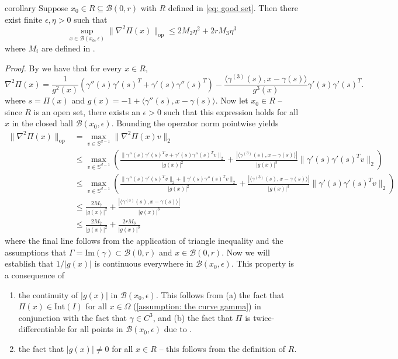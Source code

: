 \documentclass[11pt]{article}
\begin{document}
\begin{restatable}{corollary}{} \label{lemma: operator norm bound}
    Suppose $x_0 \in R \subseteq \mathcal{B}(0, r)$ with $R$ defined in \cref{eq: good set}. Then there exist finite $\epsilon, \eta > 0$ such that 
    \[ \sup_{x\in \mathcal{B}(x_0,\epsilon)}\|\nabla^2\Pi(x)\|_{\text{op}} \leq 2M_2\eta^{2}+2rM_3\eta^{3}\]
    where $M_i$ are defined in .
\end{restatable}

\noindent \textit{Proof.} By  we have that for every $x \in R$, 
\[\nabla^2\Pi(x) = \frac{1}{g^2(x)}\left(\gamma''(s)\gamma'(s)^T + \gamma'(s)\gamma''(s)^T\right)- \frac{\langle\gamma^{(3)}(s), x - \gamma(s)\rangle}{g^3(x)}\gamma'(s)\gamma'(s)^T.\]
where $s = \Pi(x)$ and $g(x) = -1 + \langle\gamma''(s), x-\gamma(s)\rangle$. Now let $x_0 \in R$ -- since $R$ is an open set, there exists an $\epsilon > 0$ such that this expression holds for all $x$ in the closed ball $\mathcal{B}(x_0, \epsilon)$. Bounding the operator norm pointwise yields
\begin{align*}
    \|\nabla^2\Pi(x)\|_{\text{op}} &= \max_{v\in \mathbb{S}^{d-1}} \|\nabla^2\Pi(x)v\|_2 \\
    &\leq \max_{v\in \mathbb{S}^{d-1}}\left(\frac{\|\gamma''(s)\gamma'(s)^Tv + \gamma'(s)\gamma''(s)^Tv\|_2}{|g(x)|^2} + \frac{|\langle\gamma^{(3)}(s), x - \gamma(s)\rangle|}{|g(x)|^3} \|\gamma'(s)\gamma'(s)^Tv\|_2\right) \\
    &\leq \max_{v\in \mathbb{S}^{d-1}}\left(\frac{\|\gamma''(s)\gamma'(s)^Tv\|_2 + \|\gamma'(s)\gamma''(s)^Tv\|_2}{|g(x)|^2} + \frac{|\langle\gamma^{(3)}(s), x - \gamma(s)\rangle|}{|g(x)|^3} \|\gamma'(s)\gamma'(s)^Tv\|_2\right) \\
    &\leq \frac{2M_2}{|g(x)|^2} + \frac{|\langle\gamma^{(3)}(s), x - \gamma(s)\rangle|}{|g(x)|^3} \\
    &\leq \frac{2M_2}{|g(x)|^2} + \frac{2r M_3}{|g(x)|^3}
\end{align*}
where the final line follows from the application of triangle inequality and the assumptions that $\Gamma = \text{Im}(\gamma) \subset \mathcal{B}(0, r)$ and $x \in  \mathcal{B}(0, r)$. Now we will establish that $1/|g(x)|$ is continuous everywhere in $\mathcal{B}(x_0,\epsilon)$. This property is a consequence of 
\begin{enumerate}
    \item the continuity of $|g(x)|$ in $\mathcal{B}(x_0, \epsilon)$. This follows from (a) the fact that $\Pi(x) \in \text{Int}(I)$ for all $x \in \Omega$ (\cref{assumption: the curve gamma}) in conjunction with the fact that $\gamma \in C^3$, and (b) the fact that $\Pi$ is twice-differentiable for all points in $\mathcal{B}(x_0, \epsilon)$ due to .
    \item the fact that $|g(x)| \neq 0$ for all $x \in R$ -- this follows from the definition of $R$.
\end{enumerate}
\end{document}
